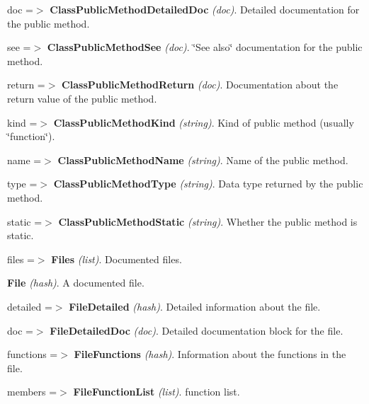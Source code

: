 \begin{DoxyItemize}
\begin{DoxyItemize}
\begin{DoxyItemize}
\begin{DoxyItemize}
\begin{DoxyItemize}
\begin{DoxyItemize}
\begin{DoxyItemize}
\begin{DoxyItemize}
\begin{DoxyItemize}
\end{DoxyItemize}
\item doc =$>$ {\bfseries ClassPublicMethodDetailedDoc} {\itshape (doc)\/}. Detailed documentation for the public method. 
\item see =$>$ {\bfseries ClassPublicMethodSee} {\itshape (doc)\/}. \char`\"{}See also\char`\"{} documentation for the public method. 
\item return =$>$ {\bfseries ClassPublicMethodReturn} {\itshape (doc)\/}. Documentation about the return value of the public method. 
\end{DoxyItemize}
\item kind =$>$ {\bfseries ClassPublicMethodKind} {\itshape (string)\/}. Kind of public method (usually \char`\"{}function\char`\"{}). 
\item name =$>$ {\bfseries ClassPublicMethodName} {\itshape (string)\/}. Name of the public method. 
\item type =$>$ {\bfseries ClassPublicMethodType} {\itshape (string)\/}. Data type returned by the public method. 
\item static =$>$ {\bfseries ClassPublicMethodStatic} {\itshape (string)\/}. Whether the public method is static. 
\end{DoxyItemize}
\end{DoxyItemize}
\end{DoxyItemize}
\end{DoxyItemize}
\end{DoxyItemize}
\item files =$>$ {\bfseries Files} {\itshape (list)\/}. Documented files. 
\begin{DoxyItemize}
\item {\bfseries File} {\itshape (hash)\/}. A documented file. 
\begin{DoxyItemize}
\item detailed =$>$ {\bfseries FileDetailed} {\itshape (hash)\/}. Detailed information about the file. 
\begin{DoxyItemize}
\item doc =$>$ {\bfseries FileDetailedDoc} {\itshape (doc)\/}. Detailed documentation block for the file. 
\end{DoxyItemize}
\item functions =$>$ {\bfseries FileFunctions} {\itshape (hash)\/}. Information about the functions in the file. 
\begin{DoxyItemize}
\item members =$>$ {\bfseries FileFunctionList} {\itshape (list)\/}. function list. 

\end{DoxyItemize}
\end{DoxyItemize}
\end{DoxyItemize}
\end{DoxyItemize}
\end{DoxyItemize}
